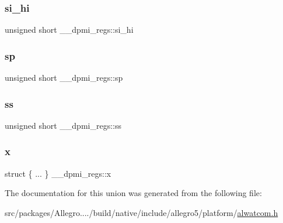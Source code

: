 \mbox{\label{union____dpmi__regs_a5347da165990bdbc9a5500031933b24d}} 
\subsubsection{\texorpdfstring{si\+\_\+hi}{si\_hi}}
{\footnotesize\ttfamily unsigned short \+\_\+\+\_\+dpmi\+\_\+regs\+::si\+\_\+hi}

\mbox{\label{union____dpmi__regs_a0615ea94ee0122643d77e40ccb2db70c}} 
\subsubsection{\texorpdfstring{sp}{sp}}
{\footnotesize\ttfamily unsigned short \+\_\+\+\_\+dpmi\+\_\+regs\+::sp}

\mbox{\label{union____dpmi__regs_a16954c7115b0696e32efcce8275ad260}} 
\subsubsection{\texorpdfstring{ss}{ss}}
{\footnotesize\ttfamily unsigned short \+\_\+\+\_\+dpmi\+\_\+regs\+::ss}

\mbox{\label{union____dpmi__regs_a84ce11da3cffdd56e2e9f053e3ccbdae}} 
\subsubsection{\texorpdfstring{x}{x}}
{\footnotesize\ttfamily struct \{ ... \}   \+\_\+\+\_\+dpmi\+\_\+regs\+::x}



The documentation for this union was generated from the following file\+:\begin{DoxyCompactItemize}
\item 
src/packages/\+Allegro..../build/native/include/allegro5/platform/\hyperlink{alwatcom_8h}{alwatcom.\+h}\end{DoxyCompactItemize}
